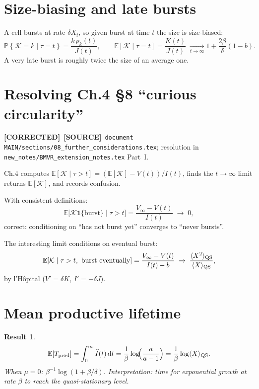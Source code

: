 \documentclass[11pt,a4paper]{article}
\newcommand{\dd}{{\rm d}}
\newcommand{\E}{\mathbb{E}}
\newcommand{\Prob}[1]{\mathbb{P}\!\left\{#1\right\}}
\newcommand{\xt}{X_t}
\newcommand{\Ihat}{\widehat{I}}
\newcommand{\Kb}{\mathcal{K}}
\theoremstyle{plain}
\newtheorem{result}{Result}[section]
\theoremstyle{definition}
\theoremstyle{remark}
\newcommand{\COR}{\textcolor{green!40!black}{\textbf{[CORRECTED]}}}
\newcommand{\SOURCE}{\textcolor{gray!50!black}{\textbf{[SOURCE]}}}
\begin{document}
\section{Size-biasing and late bursts}

A cell bursts at rate $\delta\xt$, so given burst at time $t$ the size is
size-biased:
\[
\Prob{\Kb=k\mid\tau=t}=\frac{k\,p_k(t)}{J(t)},\qquad
\E[\Kb\mid\tau=t]=\frac{K(t)}{J(t)}
\;\xrightarrow[t\to\infty]\;
1+\frac{2\beta}{\delta}(1-b).
\]
A very late burst is roughly twice the size of an average one.

\section{Resolving Ch.4 \S8 ``curious circularity''}
\COR\
\SOURCE\
\texttt{document MAIN/sections/08\_further\_considerations.tex};
resolution in
\texttt{new\_notes/BMVR\_extension\_notes.tex} Part~I.

Ch.4 computes $\E[\Kb\mid\tau>t]=(\E[\Kb]-V(t))/I(t)$, finds the $t\to\infty$
limit returns $\E[\Kb]$, and records confusion.

With consistent definitions:
\begin{equation}
\E\bigl[\Kb\mathbf 1\{\text{burst}\}\mid\tau>t\bigr]
=\frac{V_\infty-V(t)}{I(t)}
\;\xrightarrow{}\;0,
\end{equation}
correct: conditioning on ``has not burst yet'' converges to ``never bursts''.

The interesting limit conditions on eventual burst:
\begin{equation}
\E[\Kb\mid \tau>t,\ \text{burst eventually}]
=\frac{V_\infty-V(t)}{I(t)-b}
\;\xrightarrow{}\;
\frac{\langle X^2\rangle_{\rm QS}}{\langle X\rangle_{\rm QS}},
\end{equation}
by l'H\^opital ($V'=\delta K$, $I'=-\delta J$).

\section{Mean productive lifetime}
\label{sec:lifetime}

\begin{result}
\begin{equation}
\E[T_{\rm prod}]
=\int_0^\infty\Ihat(t)\,\dd t
=\frac{1}{\beta}\log\!\Bigl(\frac{a}{a-1}\Bigr)
=\frac{1}{\beta}\log\langle X\rangle_{\rm QS}.
\end{equation}
When $\mu=0$: $\beta^{-1}\log(1+\beta/\delta)$.
Interpretation: time for exponential growth at rate $\beta$ to reach the
quasi-stationary level.
\end{result}
\end{document}
